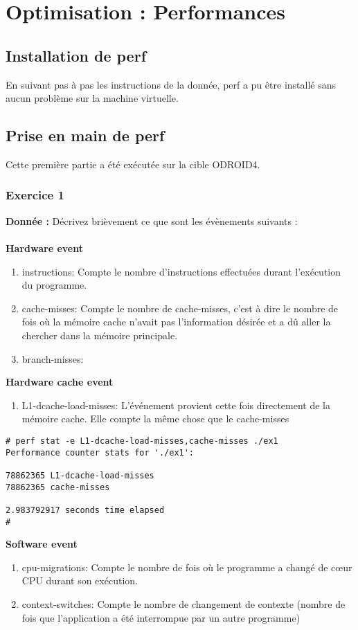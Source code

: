 \section{Optimisation : Performances}
\subsection{Installation de perf}
En suivant pas à pas les instructions de la donnée, perf a pu être installé sans aucun problème sur la machine virtuelle. 
\subsection{Prise en main de perf}
Cette première partie a été exécutée sur la cible ODROID4.
\subsubsection{Exercice 1}
\textbf{Donnée : } Décrivez	brièvement	ce	que	sont	les	évènements	suivants	:\\\\
\textbf{Hardware event}
\begin{enumerate}
	\item instructions: Compte le nombre d'instructions effectuées durant l'exécution du programme.
	\item cache-misses: Compte le nombre de cache-misses, c'est à dire le nombre de fois où la mémoire cache n'avait pas l'information désirée et a dû aller la chercher dans la mémoire principale.
	\color{red}\item branch-misses: \\
\end{enumerate}

\textbf{Hardware cache event}
\begin{enumerate}
	\item L1-dcache-load-misses: L'événement provient cette fois directement de la mémoire cache. Elle compte la même chose que le cache-misses
\end{enumerate}
\begin{lstlisting}
# perf stat -e L1-dcache-load-misses,cache-misses ./ex1                         
Performance counter stats for './ex1':                                         

78862365 L1-dcache-load-misses                                        
78862365 cache-misses                                                 

2.983792917 seconds time elapsed                                         
# 
\end{lstlisting}
\textbf{Software event}
\begin{enumerate}
	\item cpu-migrations: Compte le nombre de fois où le programme a changé de cœur CPU durant son exécution.
	\item context-switches: Compte le nombre de changement de contexte (nombre de fois que l'application a été interrompue par un autre programme)
\end{enumerate}

